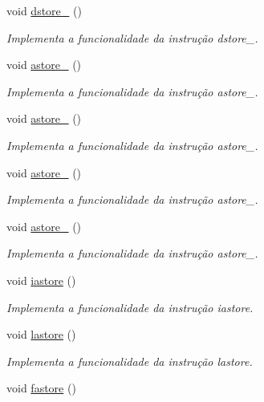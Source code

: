 \begin{DoxyCompactItemize}
void \hyperlink{classOperations_a161cba32105238617b0cfd5c47afdfe4}{dstore\+\_} ()
\begin{DoxyCompactList}\small\item\em Implementa a funcionalidade da instrução dstore\+\_. \end{DoxyCompactList}\item 
void \hyperlink{classOperations_a140f2e8501424f8a73dbfecfa3ca859f}{astore\+\_} ()
\begin{DoxyCompactList}\small\item\em Implementa a funcionalidade da instrução astore\+\_. \end{DoxyCompactList}\item 
void \hyperlink{classOperations_a1a7a41be018313dd524df5327c8b6035}{astore\+\_} ()
\begin{DoxyCompactList}\small\item\em Implementa a funcionalidade da instrução astore\+\_. \end{DoxyCompactList}\item 
void \hyperlink{classOperations_a01e238bbea0f9d61d80a8fcd3ed2f660}{astore\+\_} ()
\begin{DoxyCompactList}\small\item\em Implementa a funcionalidade da instrução astore\+\_. \end{DoxyCompactList}\item 
void \hyperlink{classOperations_ac3c02b3ff78b6222bd58bebb4f01c083}{astore\+\_} ()
\begin{DoxyCompactList}\small\item\em Implementa a funcionalidade da instrução astore\+\_. \end{DoxyCompactList}\item 
void \hyperlink{classOperations_aeec162356a6792b1d0ba385f75f443b1}{iastore} ()
\begin{DoxyCompactList}\small\item\em Implementa a funcionalidade da instrução iastore. \end{DoxyCompactList}\item 
void \hyperlink{classOperations_a562813150c331183212c11e5593b83c6}{lastore} ()
\begin{DoxyCompactList}\small\item\em Implementa a funcionalidade da instrução lastore. \end{DoxyCompactList}\item 
void \hyperlink{classOperations_aa8a2c3048379b9d5cdc2b4611ef86190}{fastore} ()

\end{DoxyCompactItemize}
